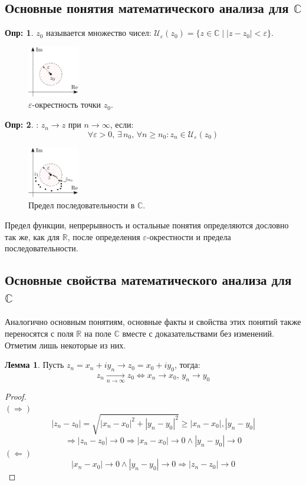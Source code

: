 \documentclass[12pt]{article}
\newcommand{\MR}{\mathbb{R}}
\newcommand{\MC}{\mathbb{C}}
\newcommand{\MU}{\mathcal{U}}
\newcommand{\VE}{\varepsilon}
\theoremstyle{definition}
\newtheorem{defn}{Опр:}
\newtheorem{lemma}{Лемма}
\begin{document}
\subsection*{Основные понятия математического анализа для $\MC$}
\begin{defn}
	\uwave{$\VE$-окрестностью точки} $z_0$ называется множество чисел: $\MU_\VE(z_0) = \{z \in \MC \mid |z - z_0| < \VE\}$.
\end{defn}
\begin{figure}[H]
	\centering
	\includegraphics[width=0.2\textwidth]{AL1L18_1.png}
	\caption{$\VE$-окрестность точки $z_0$.}
	\label{18_1}
\end{figure}
\begin{defn}
	: $z_n \to z$ при $n \to \infty$, если: 
	$$
		\forall \VE > 0, \, \exists \, n_0, \, \forall n \geq n_0 \colon z_n \in \MU_\VE(z_0)
	$$
\end{defn}
\begin{figure}[H]
	\centering
	\includegraphics[width=0.2\textwidth]{AL1L18_2.png}
	\caption{Предел последовательности в $\MC$.}
	\label{18_2}
\end{figure}
Предел функции, непрерывность и остальные понятия определяются дословно так же, как для $\MR$, после определения $\VE$-окрестности и предела последовательности.

\subsection*{Основные свойства математического анализа для $\MC$}
Аналогично основным понятиям, основные факты и свойства этих понятий также переносятся с поля $\MR$ на поле $\MC$ вместе с доказательствами без изменений. Отметим лишь некоторые из них.

\begin{lemma}
	Пусть $z_n = x_n + iy_n \to z_0 = x_0 + iy_0$, тогда:
	$$
		z_n \xrightarrow[n\to \infty]{} z_0  \Leftrightarrow x_n \to x_0, \, y_n \to y_0
	$$
\end{lemma}
\begin{proof}\hfill\\
	$(\Rightarrow)$ 
	$$
		|z_n - z_0| = \sqrt{|x_n - x_0|^2 + |y_n - y_0|^2} \geq |x_n - x_0|, |y_n - y_0|  
	$$
	$$
		\Rightarrow |z_n -z_0| \to 0 \Rightarrow |x_n - x_0| \to 0 \wedge |y_n - y_0| \to 0
	$$
	$(\Leftarrow)$ 
	$$
		|x_n -x_0| \to 0 \wedge |y_n - y_0| \to 0 \Rightarrow |z_n - z_0| \to 0
	$$
\end{proof}
\end{document}
